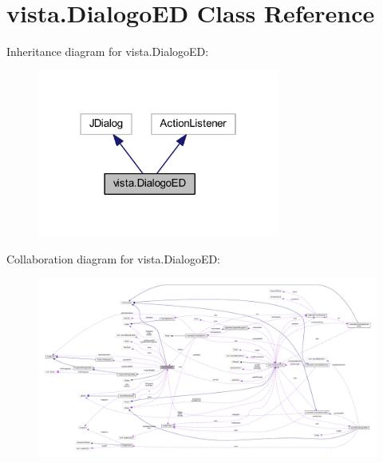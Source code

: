 \hypertarget{classvista_1_1_dialogo_e_d}{}\section{vista.\+Dialogo\+ED Class Reference}
\label{classvista_1_1_dialogo_e_d}


Inheritance diagram for vista.\+Dialogo\+ED\+:
\nopagebreak
\begin{figure}[H]
\begin{center}
\leavevmode
\includegraphics[width=226pt]{classvista_1_1_dialogo_e_d__inherit__graph}
\end{center}
\end{figure}


Collaboration diagram for vista.\+Dialogo\+ED\+:
\nopagebreak
\begin{figure}[H]
\begin{center}
\leavevmode
\includegraphics[width=350pt]{classvista_1_1_dialogo_e_d__coll__graph}
\end{center}
\end{figure}
